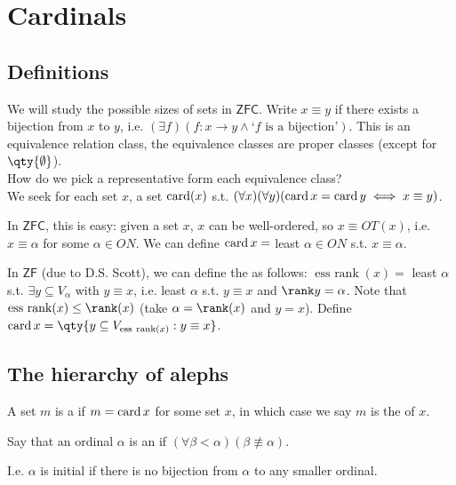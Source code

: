 \section{Cardinals}

\subsection{Definitions}
We will study the possible sizes of sets in $\mathsf{ZFC}$.
Write $x \equiv y$ if there exists a bijection from $x$ to $y$, i.e. $(\exists f)(f : x \to y \wedge \text{`$f$ is a bijection'})$.
This is an equivalence relation class, the equivalence classes are proper classes (except for $\qty{\emptyset}$). \\
How do we pick a representative form each equivalence class? \\
We seek for each set $x$, a set $\operatorname{card}(x)$ s.t. $(\forall x)(\forall y)(\operatorname{card} x = \operatorname{card} y \iff x \equiv y)$.

In $\mathsf{ZFC}$, this is easy: given a set $x$, $x$ can be well-ordered, so $x \equiv OT(x)$, i.e. $x \equiv \alpha$ for some $\alpha \in ON$.
We can define $\operatorname{card} x = $ least $\alpha \in ON$ s.t. $x \equiv \alpha$.

In $\mathsf{ZF}$ (due to D.S. Scott), we can define the  as follows:
$\operatorname{ess\ rank}(x) = $ least $\alpha$ s.t. $\exists y \subseteq V_\alpha$ with $y \equiv x$, i.e. least $\alpha$ s.t. $y \equiv x$ and $\rank y = \alpha$.
Note that $\operatorname{ess\ rank}(x) \leq \rank(x)$ (take $\alpha = \rank(x)$ and $y = x$).
Define $\card x = \qty{y  \subseteq V_{\operatorname{ess\ rank}(x)} : y \equiv x}$.

\subsection{The hierarchy of alephs}

\begin{definition}[Cardinal]
    A set $m$ is a  if $m = \operatorname{card} x$ for some set $x$, in which case we say $m$ is the  of $x$.
\end{definition}

\begin{definition}
    Say that an ordinal $\alpha$ is an  if $(\forall \beta < \alpha)(\beta \not\equiv \alpha)$.
\end{definition}
I.e. $\alpha$ is initial if there is no bijection from $\alpha$ to any smaller ordinal.

